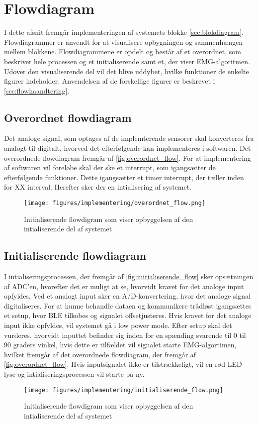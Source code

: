 \section{Flowdiagram}
I dette afsnit fremgår implementeringen af systemets blokke \autoref{sec:blokdiagram}. Flowdiagrammer er anvendt for at visualisere opbygningen og sammenhængen mellem blokkene. Flowdiagrammene er opdelt og består af et overordnet, som beskriver hele processen og et initialiserende samt et, der viser EMG-algoritmen. Udover den visualiserende del vil det blive uddybet, hvilke funktioner de enkelte figurer indeholder. Anvendelsen af de forskellige figurer er beskrevet i \autoref{sec:flowhaandtering}.

\subsection{Overordnet flowdiagram}
Det analoge signal, som optages af de implemterende sensorer skal konverteres fra analogt til digitalt, hvorved det efterfølgende kan implementeres i softwaren. Det overordnede flowdiagram fremgår af \autoref{fig:overordnet_flow}. For at implementering af softwaren vil foreløbe skal der ske et interrupt, som igangsætter de efterfølgende funktioner. Dette igangsætter et timer interrupt, der tæller inden for XX interval. Herefter sker der en intialisering af systemet.
\begin{figure}[H]
\centering
\texttt{[image: figures/implementering/overordnet\_flow.png]}
\caption{Initialiserende flowdigram som viser opbyggelsen af den intialiserende del af systemet}
\label{fig:overordnet_flow}
\end{figure}



\subsection{Initialiserende flowdiagram}
I intialiseringsprocessen, der fremgår af \autoref{fig:initialiserende_flow} sker opsætningen af ADC'en, hvorefter det er muligt at se, hvorvidt kravet for det analoge input opfyldes. Ved et analogt input sker en A/D-konvertering, hvor det analoge signal digitaliseres. For at kunne behandle dataen og kommunikere trådløst igangsættes et setup, hvor BLE tilkobes og signalet offsetjusteres. Hvis kravet for det analoge input ikke opfyldes, vil systemet gå i low power mode. Efter setup skal det vurderes, hvorvidt inputtet befinder sig inden for en spænding svarende til 0 til 90 graders vinkel, hvis dette er tilfældet vil signalet starte EMG-algortimen, hvilket fremgår af det overordnede flowdiagram, der fremgår af \autoref{fig:overordnet_flow}. Hvis inputsignalet ikke er tilstrækkeligt, vil en rød LED lyse og intialiseringsprocessen vil starte på ny. 
\begin{figure}[H]
\centering
\texttt{[image: figures/implementering/initialiserende\_flow.png]}
\caption{Initialiserende flowdigram som viser opbyggelsen af den intialiserende del af systemet}
\label{fig:initialiserende_flow}
\end{figure}

